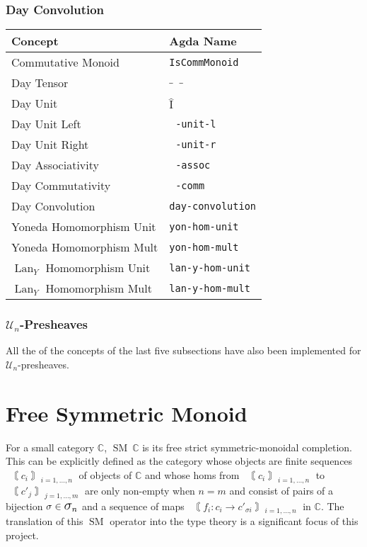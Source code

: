 \documentclass[12pt, parskip, DIV=14]{scrbook}
\newcommand{\SM}{\operatorname{SM}}
\DeclareMathOperator\daytensor{\widehat\otimes}
\newcommand{\dayid}{\operatorname{\hat{I}}}
\newcommand{\Lan}{\operatorname{Lan}}
\begin{document}
\subsection{Day Convolution}

\begin{center}
\begin{tabular}{ll}
  Concept & Agda Name \\
  \hline
  Commutative Monoid & \texttt{IsCommMonoid} \\
  Day Tensor & $\_\daytensor\_$ \\
  Day Unit & $\dayid$ \\
  Day Unit Left & \texttt{$\daytensor$-unit-l} \\
  Day Unit Right & \texttt{$\daytensor$-unit-r} \\
  Day Associativity & \texttt{$\daytensor$-assoc} \\
  Day Commutativity & \texttt{$\daytensor$-comm} \\
  Day Convolution & \texttt{day-convolution} \\
  Yoneda Homomorphism Unit & \texttt{yon-hom-unit} \\
  Yoneda Homomorphism Mult & \texttt{yon-hom-mult} \\
  $\Lan_Y$ Homomorphism Unit & \texttt{lan-y-hom-unit} \\
  $\Lan_Y$ Homomorphism Mult & \texttt{lan-y-hom-mult} \\
\end{tabular}
\end{center}

\subsection{$\mathcal{U}_n$-Presheaves}

All the of the concepts of the last five subsections have also been implemented for $\mathcal{U}_n$-presheaves.

\chapter{Free Symmetric Monoid}

For a small category $\mathbb{C}$, $\SM~\mathbb{C}$ is its free strict symmetric-monoidal completion. This can be explicitly defined as the category whose objects are finite sequences $\Lbrbrak c_i \Rbrbrak_{i = 1,\dots,n}$ of objects of $\mathbb{C}$ and whose homs from $\Lbrbrak c_i \Rbrbrak_{i = 1,\dots,n}$ to $\Lbrbrak c'_j \Rbrbrak_{j = 1,\dots,m}$ are only non-empty when $n = m$ and consist of pairs of a bijection $\sigma \in \mathlarger{\mathlarger{\mathlarger{\sigma}}}_n$ and a sequence of maps $\Lbrbrak f_i : c_i \to c'_{\sigma i} \Rbrbrak_{i = 1,\dots,n}$ in $\mathbb{C}$. The translation of this $\SM$ operator into the type theory is a significant focus of this project.
\end{document}
